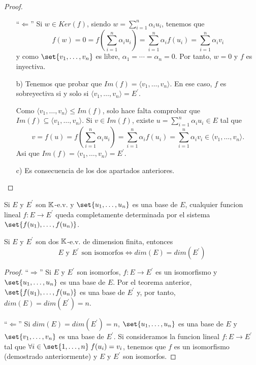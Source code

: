 \begin{proof}
\begin{enumerate}
			``\(\Leftarrow \)'' Si \(w \in Ker(f )\), siendo \(w = \sum_{i=1}^{n } \alpha_i u_i \), tenemos que
			\[
				f(w) = 0 = f(\sum_{i=1}^{n } \alpha_i u_i ) = \sum_{i=1}^{n } \alpha_i f(u_i) = \sum_{i=1}^{n } \alpha_i v_i
			\]
			y como \(\set{v_1,\ldots,v_n }\) es libre, \(\alpha_1 = \cdots = \alpha_n = 0\). Por tanto, \(w = 0 \) y \(f \) es inyectiva.
		\item[b)] Tenemos que probar que \(Im(f) = \langle v_1, \ldots, v_n \rangle \). En ese caso, \(f \) es sobreyectiva si y solo si \(\langle v_1, \ldots, v_n \rangle = E^\prime  \).

			Como \(\langle v_1, \ldots,v_n \rangle \leq Im(f )\), solo hace falta comprobar que \(Im(f) \subseteq \langle v_1, \ldots, v_n \rangle \). Si \(v \in Im(f )\), existe \(u = \sum_{i=1}^{n} \alpha_i u_i \in E \) tal que
			\[
				v = f(u) = f(\sum_{i=1}^{n } \alpha_i u_i) = \sum_{i=1}^{n } \alpha_i f(u_i) = \sum_{i=1}^{n } \alpha_i v_i \in \langle v_1, \ldots, v_n \rangle.
			\]
			Asi que \(Im(f) = \langle v_1,\ldots,v_n \rangle = E^\prime \).

		\item[c)] Es consecuencia de los dos apartados anteriores.
	\end{enumerate}
\end{proof}

\begin{corollary}
	Si \(E \) y \(E^\prime \) son \(\mathbb{K} \)-e.v. y \(\set{u_1,\ldots,u_n} \) es una base de \(E \), cualquier funcion lineal \(f \colon E \to E^\prime \) queda completamente determinada por el sistema \(\set{f(u_1),\ldots,f(u_n )}\).
\end{corollary}

\begin{corollary}
	Si \(E \) y \(E^\prime  \) son dos \(\mathbb{K} \)-e.v. de dimension finita, entonces
	\[
		E \text{ y } E^\prime \text{ son isomorfos} \iff dim(E) = dim(E^\prime )
	\]
\end{corollary}
\begin{proof}
	``\(\Rightarrow \)'' Si \(E \) y \(E^\prime  \) son isomorfos, \(f \colon E \to E^\prime \) es un isomorfismo y \(\set{u_1,\ldots,u_n }\) es una base de \(E \). Por el teorema anterior, \(\set{f(u_1),\ldots,f(u_n )}\) es una base de \(E^\prime  \) y, por tanto, \(dim(E) = dim(E^\prime ) = n \).

	``\(\Leftarrow \)'' Si \(dim(E) = dim(E^\prime ) = n \), \(\set{u_1,\ldots,u_n }\) es una base de \(E \) y \(\set{v_1,\ldots,v_n }\) es una base de \(E^\prime \). Si consideramos la funcion lineal \(f \colon E \to E^\prime \) tal que \(\forall  i \in \set{1,\ldots,n } \; f(u_i) = v_i \), tenemos que \(f\) es un isomorfismo (demostrado anteriormente) y \(E \) y \(E^\prime  \) son isomorfos.
\end{proof}

